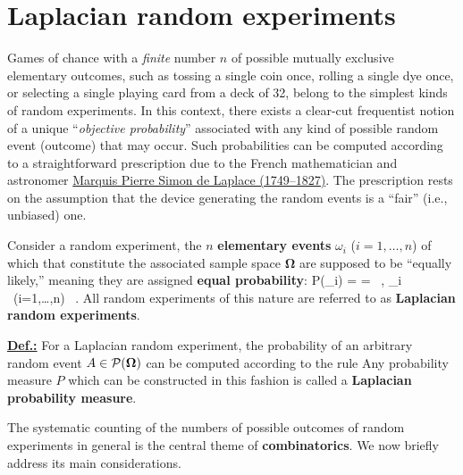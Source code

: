 \section[Laplacian random experiments]{Laplacian random
experiments}
Games of chance with a \textit{finite} number $n$ of possible 
mutually exclusive elementary outcomes, such as tossing a single 
coin once, rolling a single dye once, or selecting a single 
playing card from a deck of 32, belong to the simplest kinds of 
random experiments. In this context, there exists a clear-cut 
frequentist notion of a unique ``\textit{objective probability}'' 
associated with any kind of possible random event (outcome) that 
may occur.
Such probabilities can be computed according to a straightforward 
prescription due to the French mathematician and astronomer
\href{http://www-history.mcs.st-and.ac.uk/Biographies/Laplace.html}{Marquis Pierre Simon de Laplace (1749--1827)}. The prescription
rests on the assumption that the device generating the random 
events is a ``fair'' (i.e., unbiased) one.

\medskip
\noindent
Consider a random experiment, the $n$ \textbf{elementary events} 
$\omega_{i}$ ($i=1,\ldots,n$) of which that constitute the 
associated sample space $\boldsymbol{\Omega}$ are supposed to 
be ``equally likely,'' meaning they are assigned \textbf{equal 
probability}:
%
\be
P(\omega_{i}) = 
=  \ ,
\quad{}\quad \omega_{i}\in\boldsymbol{\Omega}
\ (i=1,\ldots,n) \ .
\ee
%
All random experiments of this nature are referred to as 
\textbf{Laplacian random experiments}.

\medskip
\noindent
\underline{\textbf{Def.:}} For a Laplacian random experiment,
the probability of an arbitrary random event $A \in 
{\cal P}(\boldsymbol{\Omega})$ can be computed according to the 
rule
%
\be
{}
\ee
%
Any probability measure $P$ which can be constructed in this 
fashion is called a \textbf{Laplacian probability measure}.

\medskip
\noindent
The systematic counting of the numbers of possible outcomes of 
random experiments in general is the central theme of
\textbf{combinatorics}. We now briefly address its main
considerations.

